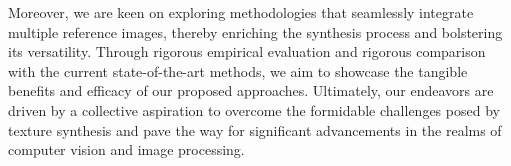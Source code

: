 \begin{introduction}
Moreover, we are keen on exploring methodologies that seamlessly integrate multiple reference images, thereby enriching the synthesis process and bolstering its versatility. Through rigorous empirical evaluation and rigorous comparison with the current state-of-the-art methods, we aim to showcase the tangible benefits and efficacy of our proposed approaches. Ultimately, our endeavors are driven by a collective aspiration to overcome the formidable challenges posed by texture synthesis and pave the way for significant advancements in the realms of computer vision and image processing.


\end{introduction}
